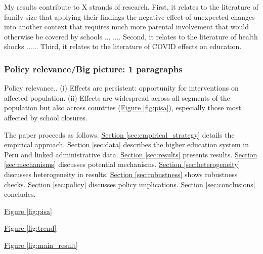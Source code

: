 

My results contribute to X strands of research. First, it relates to the literature of family size that applying their findings the negative effect of unexpected changes into another context that requires much more parental involvement that would otherwise be covered by schools ... \cite{black_small_2010}.... Second, it relates to the literature of health shocks ...\cite{black_sibling_2021}... Third, it relates to the literature of COVID effects on education.



\subsubsection{Policy relevance/Big picture: 1 paragraphs}

Policy relevance.. (i) Effects are persistent: opportunity for interventions on affected population. (ii) Effects are widespread across all segments of the population but also across countries (\hyperref[fig:pisa]{Figure \ref{fig:pisa}}), especially those most affected by school closures.



The paper proceeds as follows. \hyperref[sec:empirical_strategy]{Section \ref{sec:empirical_strategy}} details the empirical approach. \hyperref[sec:data]{Section \ref{sec:data}}  describes the higher education system in Peru and linked administrative data. \hyperref[sec:results]{Section \ref{sec:results}} presents results. \hyperref[sec:mechanisms]{Section \ref{sec:mechanisms}} discusses potential mechanisms. \hyperref[sec:heterogeneity]{Section \ref{sec:heterogeneity}} discusses heterogeneity in results. \hyperref[sec:robustness]{Section \ref{sec:robustness}} shows robustness checks. \hyperref[sec:policy]{Section \ref{sec:policy}} discusses policy implications. \hyperref[sec:conclusions]{Section \ref{sec:conclusions}} concludes.

\newpage

\hyperref[fig:pisa]{Figure \ref{fig:pisa}}

\hyperref[fig:trend]{Figure \ref{fig:trend}}


\hyperref[fig:main_result]{Figure \ref{fig:main_result}}


